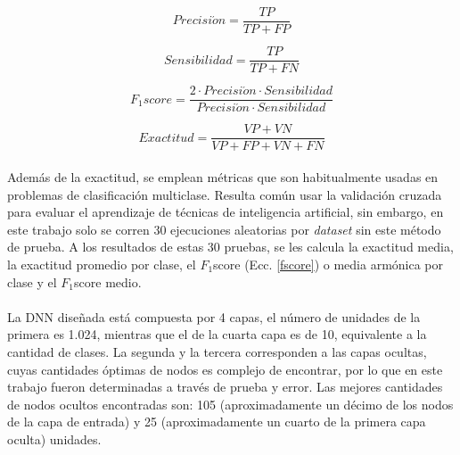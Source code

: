\documentclass[12pt]{article}%
\begin{document}
\begin{equation}
\label{precision}
Precisi\acute{o}n = \frac{TP}{TP+FP}
\end{equation}

\begin{equation}
\label{sensibilidad}
Sensibilidad = \frac{TP}{TP+FN}
\end{equation}

\begin{equation}
\label{fscore}
F_{1}score = \frac{2\cdot{Precisi\acute{o}n}\cdot{Sensibilidad}}{Precisi\acute{o}n\cdot{Sensibilidad}}
\end{equation}

\begin{equation}
\label{acc}
Exactitud = \frac{VP+VN}{VP+FP+VN+FN}
\end{equation} 

\paragraph{}
Además de la exactitud, se emplean métricas que son habitualmente usadas en problemas de clasificación multiclase. Resulta común usar la validación cruzada para evaluar el aprendizaje de técnicas de inteligencia artificial, sin embargo, en este trabajo solo se corren 30 ejecuciones aleatorias por \textit{dataset} sin este método de prueba. A los resultados de estas 30 pruebas, se les calcula la exactitud media, la exactitud promedio por clase, el $F_{1}$score (Ecc. \ref{fscore}) o media armónica por clase y el $F_{1}$score medio.

\paragraph{}
La DNN diseñada está compuesta por 4 capas, el número de unidades de la primera es 1.024, mientras que el de la cuarta capa es de 10, equivalente a la cantidad de clases. La segunda y la tercera corresponden a las capas ocultas, cuyas cantidades óptimas de nodos es complejo de encontrar, por lo que en este trabajo fueron determinadas a través de prueba y error. Las mejores cantidades de nodos ocultos encontradas son: 105 (aproximadamente un décimo de los nodos de la capa de entrada) y 25 (aproximadamente un cuarto de la primera capa oculta) unidades.
\end{document}
